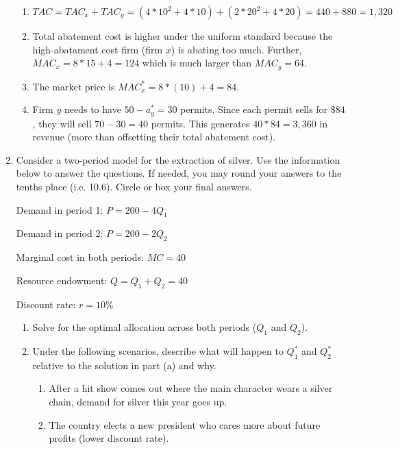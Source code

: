 \documentclass[11pt]{article}
\newcommand{\points}[1]{\iftoggle{INCLUDEPOINTS}{{\color{blue!70!white}(#1 pts.)}}{}}
\begin{document}
\begin{enumerate}
{\begin{enumerate}
      \item $TAC = TAC_x + TAC_y = (4 * 10^2 + 4 * 10) + (2 * 20^2 + 4 * 20) = 440 + 880 = 1,320$
      
      \item Total abatement cost is higher under the uniform standard because the high-abatament cost firm (firm $x$) is abating too much. Further, $MAC_x = 8 * 15 + 4 = 124$ which is much larger than $MAC_y = 64$. 
      
      \item The market price is $MAC_x^* = 8 * (10) + 4 = 84$.
      
      \item Firm $y$ needs to have $50 - a_y^* = 30$ permits. Since each permit sells for $\$84$, they will sell $70 - 30 = 40$ permits. This generates $40 * 84 = 3,360$ in revenue (more than offsetting their total abatement cost). 
    \end{enumerate}
  }

  \item Consider a two-period model for the extraction of silver. Use the information below to answer the questions. If needed, you may round your answers to the tenths place (i.e. 10.6). Circle or box your final answers.

  Demand in period 1: $P = 200 - 4Q_1$
  
  Demand in period 2: $P = 200 - 2Q_2$
  
  Marginal cost in both periods: $MC = 40$
  
  Resource endowment: $Q = Q_1 + Q_2 = 40$
  
  Discount rate: $r = 10\%$
  
  \begin{enumerate}
    \item \points{10} Solve for the optimal allocation across both periods ($Q_1$ and $Q_2$).
    \item \points{10} Under the following scenarios, describe what will happen to $Q_1^*$ and $Q_2^*$ relative to the solution in part (a) and why.
    
    \begin{enumerate}
      \item After a hit show comes out where the main character wears a silver chain, demand for silver this year goes up.
      
      \item The country elects a new president who cares more about future profits (lower discount rate).
    \end{enumerate}
  \end{enumerate}


\end{enumerate}
\end{document}
